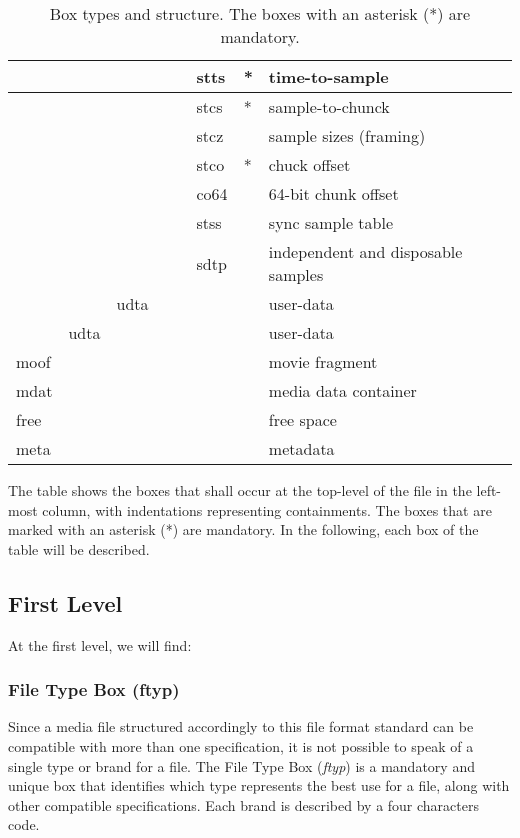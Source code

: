 \begin{table}[]
\begin{tabular}{|l|l|l|l|l|l|l|l|l}
       &      &      &      &      & stts & * & time-to-sample \\ \hline
       &      &      &      &      & stcs & * & sample-to-chunck \\ \hline
       &      &      &      &      & stcz &   & sample sizes (framing) \\ \hline
       &      &      &      &      & stco & * & chuck offset \\ \hline
       &      &      &      &      & co64 &   & 64-bit chunk offset \\ \hline
       &      &      &      &      & stss &   & sync sample table \\ \hline
       &      &      &      &      & sdtp &   & independent and disposable samples \\ \hline
       &      & udta &      &      &      &   & user-data \\ \hline
       & udta &      &      &      &      &   & user-data \\ \hline
  moof &      &      &      &      &      &   & movie fragment \\ \hline
  mdat &      &      &      &      &      &   & media data container \\ \hline
  free &      &      &      &      &      &   & free space \\ \hline
  meta &      &      &      &      &      &   & metadata \\ \hline
\end{tabular}
\caption{Box types and structure. The boxes with an asterisk (*) are mandatory.}\label{boxtable}
\end{table}

The table shows the boxes that shall occur at the top-level of the file in the left-most column, with indentations representing containments. The boxes that are marked with an asterisk (*) are mandatory. In the following, each box of the table will be described.

\subsection{First Level}

At the first level, we will find:

\subsubsection*{File Type Box (ftyp)}

Since a media file structured accordingly to this file format standard can be compatible with more than one specification, it is not possible to speak of a single type or brand for a file.
The File Type Box (\emph{ftyp}) is a mandatory and unique box that identifies which type represents the best use for a file, along with other compatible specifications. Each brand is described by a four characters code.

